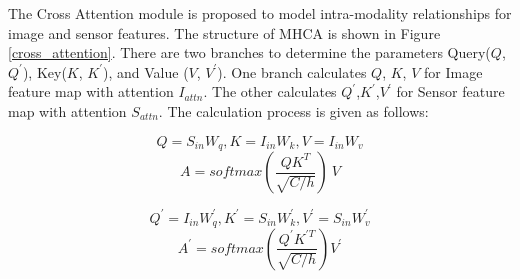 \documentclass[acmsmall, screen]{acmart}
\begin{document}
The Cross Attention module is proposed to model intra-modality relationships for image and sensor features. The structure of MHCA is shown in Figure \ref{cross_attention}. There are two branches to determine the parameters Query(\begin{math}
  Q
\end{math}, \begin{math}
  Q^\prime
\end{math}), Key(\begin{math}
  K
\end{math}, \begin{math}
  K^\prime
\end{math}), and Value (\begin{math}
  V
\end{math}, \begin{math}
  V^\prime
\end{math}). One branch calculates \begin{math}
  Q
\end{math}, \begin{math}
  K
\end{math}, \begin{math}
  V
\end{math} for Image feature map with attention \begin{math}
  I_{attn}
\end{math}. The other calculates \begin{math}
  Q^\prime
\end{math},\begin{math}
  K^\prime
\end{math},\begin{math}
  V^\prime
\end{math} for Sensor feature map with attention \begin{math}
  S_{attn}
\end{math}. The calculation process is given as follows:

\begin{equation}
  Q=S_{in}W_q,K=I_{in}W_k,V=I_{in}W_v
\end{equation}
\begin{equation}
  A=softmax\left(\frac{QK^T}{\sqrt{C/h}}\right)\ V
\end{equation}

\begin{equation}
  Q^\prime=I_{in}W_q^\prime,K^\prime=S_{in}W_k^\prime,V^\prime=S_{in}W_v^\prime
\end{equation}
\begin{equation}
  A^\prime=softmax\left(\frac{Q^\prime K^{\prime T}}{\sqrt{C/h}}\right)V^\prime
\end{equation}
\end{document}
